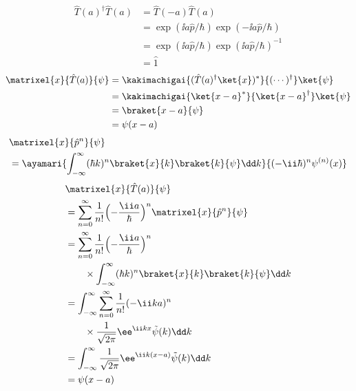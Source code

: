 \begin{align*}
\hat{T}(a)^{\dagger}\hat{T}(a)&=\hat{T}(-a)\hat{T}(a)\\
&=\exp(\ii a\hat{p}/\hbar)\exp(-\ii a\hat{p}/\hbar)\\
&=\exp(\ii a\hat{p}/\hbar)\exp(\ii a\hat{p}/\hbar)^{-1}\\
&=\hat{1}
\end{align*}
\begin{align*}
\matrixel{x}{\hat{T}(a)}{\psi}&=\kakimachigai{(\hat{T}(a)^{\dagger}\ket{x})^{*}}{(\cdots)^{\dagger}}\ket{\psi}\\
&=\kakimachigai{\ket{x-a}^{*}}{\ket{x-a}^{\dagger}}\ket{\psi}\\
&=\braket{x-a}{\psi}\\
&=\psi(x-a)
\end{align*}
\begin{align*}
&\matrixel{x}{\hat{p}^{n}}{\psi}\\
&=\ayamari{\int_{-\infty}^{\infty}(\hbar k)^{n}\braket{x}{k}\braket{k}{\psi}\dd k}{(-\ii\hbar)^{n}\psi^{(n)}(x)}
\end{align*}
\begin{align*}
&\matrixel{x}{\hat{T}(a)}{\psi}\\
&=\sum_{n=0}^{\infty}\frac{1}{n!}\Bigl(-\frac{\ii a}{\hbar}\Bigr)^{n}\matrixel{x}{\hat{p}^{n}}{\psi}\\
&=\sum_{n=0}^{\infty}\frac{1}{n!}\Bigl(-\frac{\ii a}{\hbar}\Bigr)^{n}\\
&\qquad\times\int_{-\infty}^{\infty}(\hbar k)^{n}\braket{x}{k}\braket{k}{\psi}\dd k\\
&=\int_{-\infty}^{\infty}\sum_{n=0}^{\infty}\frac{1}{n!}(-\ii ka)^{n}\\
&\qquad\times\frac{1}{\sqrt{2\pi}}\ee^{\ii kx}\tilde{\psi}(k)\dd k\\
&=\int_{-\infty}^{\infty}\frac{1}{\sqrt{2\pi}}\ee^{\ii k(x-a)}\tilde{\psi}(k)\dd k\\
&=\psi(x-a)
\end{align*}

